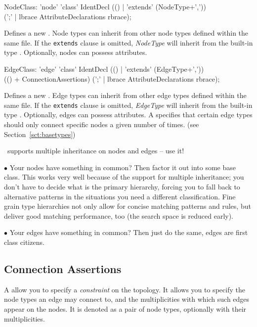 \begin{rail}
  NodeClass: 'node' 'class' IdentDecl (() | 'extends' (NodeType+',')) \\
    (';' | lbrace AttributeDeclarations rbrace);
\end{rail}
Defines a new .
Node types can inherit from other node types defined within the same file.
If the \texttt{extends} clause is omitted, \emph{NodeType} will inherit from the built-in type \texttt{}.
Optionally, nodes can possess attributes.

\begin{rail}
  EdgeClass: 'edge' 'class' IdentDecl (() | 'extends' (EdgeType+',')) \\
    (() + ConnectionAssertions) (';' | lbrace AttributeDeclarations rbrace);
\end{rail}
Defines a new .
Edge types can inherit from other edge types defined within the same file.
If the \texttt{extends} clause is omitted, \emph{EdgeType} will inherit from the built-in type \texttt{}.
Optionally, edges can possess attributes.
A  specifies that certain edge types should only connect specific nodes a given number of times.
(see Section~\ref{sct:basetypes})

\begin{note}
\GrG~supports multiple inheritance on nodes and edges -- use it!

$\bullet$ Your nodes have something in common?
Then factor it out into some base class.
This works very well because of the support for multiple inheritance; you don't have to decide what is the primary hierarchy, forcing you to fall back to alternative patterns in the situations you need a different classification.
Fine grain type hierarchies not only allow for concise matching patterns and rules,
but deliver good matching performance, too (the search space is reduced early).

$\bullet$ Your edges have something in common?
Then just do the same, edges are first class citizens.
\end{note}

\pagebreak

\subsection*{Connection Assertions}
A \emph{} allow you to specify a \emph{constraint} on the topology.
It allows you to specify the node types an edge may connect to, and the multiplicities with which such edges appear on the nodes.
It is denoted as a pair of node types, optionally with their multiplicities.

